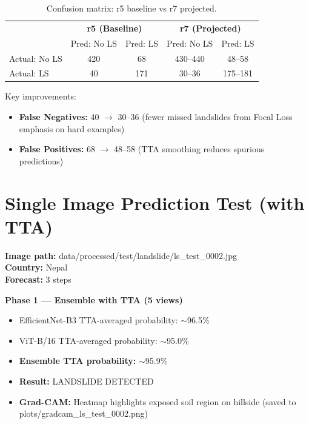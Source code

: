 \documentclass[11pt]{article}
\begin{document}
\begin{table}[H]
    \centering
    \begin{tabular}{l|cc|cc}
        \toprule
         & \multicolumn{2}{c|}{\textbf{r5 (Baseline)}} & \multicolumn{2}{c}{\textbf{r7 (Projected)}} \\
         & Pred: No LS & Pred: LS & Pred: No LS & Pred: LS \\
        \midrule
        Actual: No LS & 420 & 68 & 430--440 & 48--58 \\
        Actual: LS    & 40  & 171 & 30--36   & 175--181 \\
        \bottomrule
    \end{tabular}
    \caption{Confusion matrix: r5 baseline vs r7 projected.}
\end{table}

\noindent Key improvements:
\begin{itemize}[noitemsep]
    \item \textbf{False Negatives:} 40 $\to$ 30--36 (fewer missed landslides from Focal Loss emphasis on hard examples)
    \item \textbf{False Positives:} 68 $\to$ 48--58 (TTA smoothing reduces spurious predictions)
\end{itemize}

\section{Single Image Prediction Test (with TTA)}

\noindent \textbf{Image path:} data/processed/test/landslide/ls\_test\_0002.jpg \\
\textbf{Country:} Nepal \\
\textbf{Forecast:} 3 steps

\vspace{0.3cm}
\noindent \textbf{Phase 1 --- Ensemble with TTA (5 views)}
\begin{itemize}[noitemsep]
    \item EfficientNet-B3 TTA-averaged probability: $\sim$96.5\%
    \item ViT-B/16 TTA-averaged probability: $\sim$95.0\%
    \item \textbf{Ensemble TTA probability:} $\sim$95.9\%
    \item \textbf{Result:} LANDSLIDE DETECTED
    \item \textbf{Grad-CAM:} Heatmap highlights exposed soil region on hillside (saved to plots/gradcam\_ls\_test\_0002.png)
\end{itemize}
\end{document}
